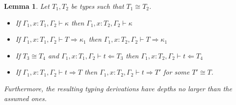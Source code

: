 \documentclass{article}
\newcommand{\tpcheck}[0]{\Leftarrow}
\newcommand{\tpsynth}[0]{\Rightarrow}
\newtheorem{lemma}[theorem]{Lemma}
\begin{document}
\begin{lemma}
  \label{lem:ctxt-conv-class2}
  Let \(T_1,T_2\) be types such that \(T_1 \cong T_2\).
  \begin{itemize}
  \item If \(\Gamma_1,x:T_1,\Gamma_2 \vdash \kappa\) then
    \(\Gamma_1,x:T_2,\Gamma_2 \vdash \kappa\) 
    
  \item If \(\Gamma_1,x:T_1,\Gamma_2 \vdash T \tpsynth \kappa_1\) then
    \(\Gamma_1,x:T_2,\Gamma_2 \vdash T \tpsynth \kappa_1\)

    
  \item If \(T_3 \cong T_4\) and \(\Gamma_1,x:T_1,\Gamma_2 \vdash t \tpcheck T_3\) then
    \(\Gamma_1,x:T_2,\Gamma_2 \vdash t \tpcheck T_4\)
    
  \item If \(\Gamma_1,x:T_1,\Gamma_2 \vdash t \tpsynth T\) then
    \(\Gamma_1,x:T_2,\Gamma_2 \vdash t \tpsynth T'\) for some \(T' \cong T\).

  \end{itemize}
  Furthermore, the resulting typing derivations have depths no larger than the assumed ones.
\end{lemma}
\end{document}
